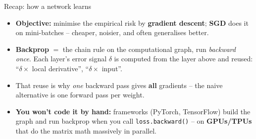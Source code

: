 \documentclass[aspectratio=43]{beamer}
\begin{document}
\begin{frame}{Recap: how a network learns}
  \begin{itemize}\small
    \item \textbf{Objective:} minimise the empirical risk by \textbf{gradient descent};
      \textbf{SGD} does it on mini-batches -- cheaper, noisier, and often generalises better.
    \item \textbf{Backprop} $=$ the chain rule on the computational graph, run \emph{backward
      once}. Each layer's error signal $\delta$ is computed from the layer above and reused:
      ``$\delta\times$ local derivative'', ``$\delta\times$ input''.
    \item That reuse is why \emph{one} backward pass gives \textbf{all} gradients -- the naive
      alternative is one forward pass per weight.
    \item \textbf{You won't code it by hand:} frameworks (PyTorch, TensorFlow) build the graph
      and run backprop when you call \texttt{loss.backward()} -- on \textbf{GPUs/TPUs} that do
      the matrix math massively in parallel.
  \end{itemize}
  \vfill
\end{frame}
\end{document}
